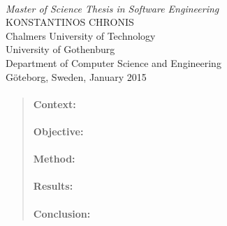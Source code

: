 \begin{titlepage}

\mbox{}
\vfill
\addtolength{\voffset}{2cm}
\begin{flushleft}
	{ \\[0.5cm]
	\emph{\Large Master of Science Thesis in Software Engineering} \\[.8cm]
	
	{\huge KONSTANTINOS CHRONIS}\\[.8cm]
	
	{\Large Chalmers University of Technology \\
    University of Gothenburg} \\
     Department of Computer Science and Engineering \\
     Göteborg, Sweden,  January 2015
  } 
	
\end{flushleft}

\end{titlepage}
\ClearShipoutPicture

\pagestyle{empty}
\newpage
\clearpage
\mbox{}
\newpage
\clearpage
\thispagestyle{empty}

\begin{abstract}
\paragraph{Context:} 

\paragraph{Objective:} 
 
\paragraph{Method:} 

\paragraph{Results:} 

\paragraph{Conclusion:} 
\end{abstract}

\newpage
\clearpage
\mbox{}
\newpage
\clearpage
\thispagestyle{empty}
